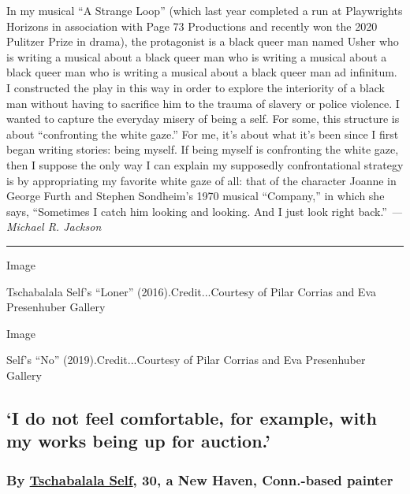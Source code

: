 In my musical ``A Strange Loop'' (which last year completed a run at
Playwrights Horizons in association with Page 73 Productions and
recently won the 2020 Pulitzer Prize in drama), the protagonist is a
black queer man named Usher who is writing a musical about a black queer
man who is writing a musical about a black queer man who is writing a
musical about a black queer man ad infinitum. I constructed the play in
this way in order to explore the interiority of a black man without
having to sacrifice him to the trauma of slavery or police violence. I
wanted to capture the everyday misery of being a self. For some, this
structure is about ``confronting the white gaze.'' For me, it's about
what it's been since I first began writing stories: being myself. If
being myself is confronting the white gaze, then I suppose the only way
I can explain my supposedly confrontational strategy is by appropriating
my favorite white gaze of all: that of the character Joanne in George
Furth and Stephen Sondheim's 1970 musical ``Company,'' in which she
says, ``Sometimes I catch him looking and looking. And I just look right
back.'' \emph{--- Michael R. Jackson}

\begin{center}\rule{0.5\linewidth}{\linethickness}\end{center}

Image

Tschabalala Self's ``Loner'' (2016).Credit...Courtesy of Pilar Corrias
and Eva Presenhuber Gallery

Image

Self's ``No'' (2019).Credit...Courtesy of Pilar Corrias and Eva
Presenhuber Gallery

\hypertarget{i-do-not-feel-comfortable-for-example-with-my-works-being-up-for-auction}{%
\subsection{`I do not feel comfortable, for example, with my works being
up for
auction.'}\label{i-do-not-feel-comfortable-for-example-with-my-works-being-up-for-auction}}

\hypertarget{by-tschabalala-self-30-a-new-haven-conn-based-painter}{%
\subsubsection{\texorpdfstring{By
\href{https://tschabalalaself.com/}{Tschabalala Self}, 30, a New Haven,
Conn.-based
painter}{By Tschabalala Self, 30, a New Haven, Conn.-based painter}}\label{by-tschabalala-self-30-a-new-haven-conn-based-painter}}

